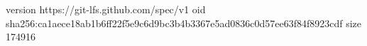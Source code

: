 version https://git-lfs.github.com/spec/v1
oid sha256:ca1aece18ab1b6ff22f5e9c6d9bc3b4b3367e5ad0836c0d57ee63f84f8923cdf
size 174916
